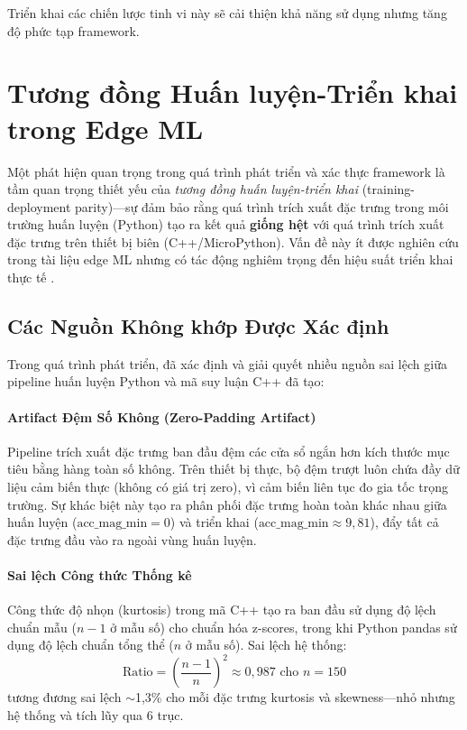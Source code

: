 Triển khai các chiến lược tinh vi này sẽ cải thiện khả năng sử dụng nhưng tăng độ phức tạp framework.

\section{Tương đồng Huấn luyện-Triển khai trong Edge ML}
\label{sec:training_deployment_parity}

Một phát hiện quan trọng trong quá trình phát triển và xác thực framework là tầm quan trọng thiết yếu của \textit{tương đồng huấn luyện-triển khai} (training-deployment parity)---sự đảm bảo rằng quá trình trích xuất đặc trưng trong môi trường huấn luyện (Python) tạo ra kết quả \textbf{giống hệt} với quá trình trích xuất đặc trưng trên thiết bị biên (C++/MicroPython). Vấn đề này ít được nghiên cứu trong tài liệu edge ML nhưng có tác động nghiêm trọng đến hiệu suất triển khai thực tế \cite{paleyes2022challenges, sculley2015hidden}.

\subsection{Các Nguồn Không khớp Được Xác định}
Trong quá trình phát triển, đã xác định và giải quyết nhiều nguồn sai lệch giữa pipeline huấn luyện Python và mã suy luận C++ đã tạo:

\paragraph{Artifact Đệm Số Không (Zero-Padding Artifact)}
Pipeline trích xuất đặc trưng ban đầu đệm các cửa sổ ngắn hơn kích thước mục tiêu bằng hàng toàn số không. Trên thiết bị thực, bộ đệm trượt luôn chứa đầy dữ liệu cảm biến thực (không có giá trị zero), vì cảm biến liên tục đo gia tốc trọng trường. Sự khác biệt này tạo ra phân phối đặc trưng hoàn toàn khác nhau giữa huấn luyện ($\text{acc\_mag\_min} = 0$) và triển khai ($\text{acc\_mag\_min} \approx 9{,}81$), đẩy tất cả đặc trưng đầu vào ra ngoài vùng huấn luyện.

\paragraph{Sai lệch Công thức Thống kê}
Công thức độ nhọn (kurtosis) trong mã C++ tạo ra ban đầu sử dụng độ lệch chuẩn mẫu ($n-1$ ở mẫu số) cho chuẩn hóa z-scores, trong khi Python pandas sử dụng độ lệch chuẩn tổng thể ($n$ ở mẫu số). Sai lệch hệ thống:
\begin{equation}
    \text{Ratio} = \left(\frac{n-1}{n}\right)^2 \approx 0{,}987 \text{ cho } n = 150
\end{equation}
tương đương sai lệch $\sim$1,3\% cho mỗi đặc trưng kurtosis và skewness---nhỏ nhưng hệ thống và tích lũy qua 6 trục.

